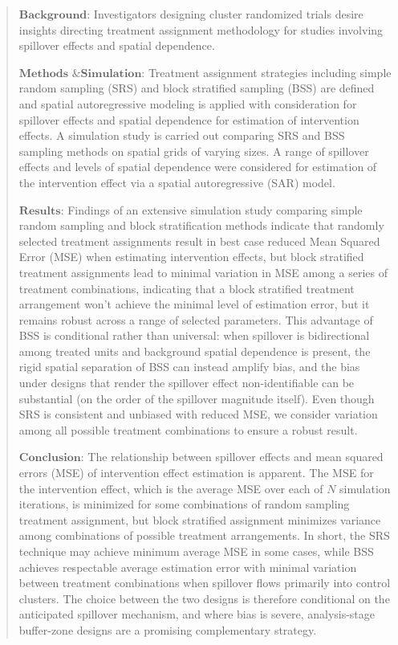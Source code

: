 \documentclass{article}[11pt]
\begin{document}
\begin{abstract}
   $\textbf{Background}$: Investigators designing cluster randomized trials desire insights directing treatment assignment methodology for studies involving spillover effects and spatial dependence.

   $\textbf{Methods \& Simulation}$: Treatment assignment strategies including simple random sampling (SRS) and block stratified sampling (BSS) are defined and spatial autoregressive modeling is applied with consideration for spillover effects and spatial dependence for estimation of intervention effects. A simulation study is carried out comparing SRS and BSS sampling methods on spatial grids of varying sizes. A range of spillover effects and levels of spatial dependence were considered for estimation of the intervention effect via a spatial autoregressive (SAR) model.

   $\textbf{Results}$: Findings of an extensive simulation study comparing simple random sampling and block stratification methods indicate that randomly selected treatment assignments result in best case reduced Mean Squared Error (MSE) when estimating intervention effects, but block stratified treatment assignments lead to minimal variation in MSE among a series of treatment combinations, indicating that a block stratified treatment arrangement won’t achieve the minimal level of estimation error, but it remains robust across a range of selected parameters. This advantage of BSS is conditional rather than universal: when spillover is bidirectional among treated units and background spatial dependence is present, the rigid spatial separation of BSS can instead amplify bias, and the bias under designs that render the spillover effect non-identifiable can be substantial (on the order of the spillover magnitude itself). Even though SRS is consistent and unbiased with reduced MSE, we consider variation among all possible treatment combinations to ensure a robust result.

   $\textbf{Conclusion}$: The relationship between spillover effects and mean squared errors (MSE) of intervention effect estimation is apparent. The MSE for the intervention effect, which is the average MSE over each of $N$ simulation iterations, is minimized for some combinations of random sampling treatment assignment, but block stratified assignment minimizes variance among combinations of possible treatment arrangements. In short, the SRS technique may achieve minimum average MSE in some cases, while BSS achieves respectable average estimation error with minimal variation between treatment combinations when spillover flows primarily into control clusters. The choice between the two designs is therefore conditional on the anticipated spillover mechanism, and where bias is severe, analysis-stage buffer-zone designs are a promising complementary strategy.
\end{abstract}
\end{document}
